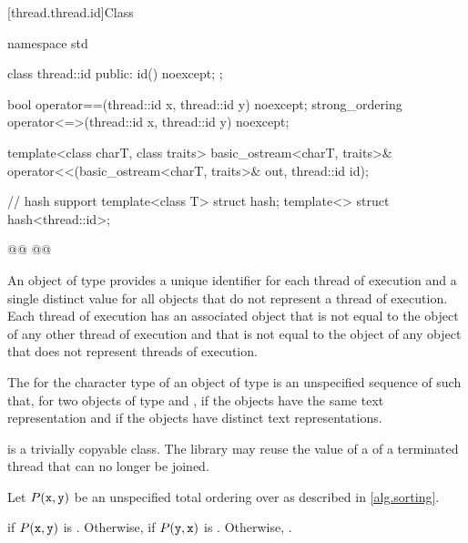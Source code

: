 \documentclass{wg21}
\begin{document}
[thread.thread.id]{Class }

%
%
\begin{codeblock}
    namespace std {
        class thread::id {
            public:
            id() noexcept;
        };

        bool operator==(thread::id x, thread::id y) noexcept;
        strong_ordering operator<=>(thread::id x, thread::id y) noexcept;

        template<class charT, class traits>
        basic_ostream<charT, traits>&
        operator<<(basic_ostream<charT, traits>& out, thread::id id);

        // hash support
        template<class T> struct hash;
        template<> struct hash<thread::id>;

        @@
        @@
    }
\end{codeblock}

\pnum
An object of type  provides a unique identifier for
each thread of execution and a single distinct value for all 
objects that do not represent a thread of
execution. Each thread of execution has an
associated  object that is not equal to the
 object of any other thread of execution and that is not
equal to the  object of any  object that
does not represent threads of execution.

\begin{addedblock}
The  for the character type  of an object of type 
is an unspecified sequence of  such that, for two objects of type   and ,
if  the  objects have the same text
representation and if  the  objects have
distinct text representations.
\end{addedblock}

\pnum
{} is a trivially copyable class.
The library may reuse the value of a  of a terminated thread that can no longer be joined.


\begin{itemdescr}
    \pnum
    Let $P(\texttt{x}, \texttt{y})$ be
    an unspecified total ordering over 
    as described in \ref{alg.sorting}.

    \pnum
    \returns
     if $P(\texttt{x}, \texttt{y})$ is .
    Otherwise, 
    if $P(\texttt{y}, \texttt{x})$ is .
    Otherwise, .
\end{itemdescr}
\end{document}
